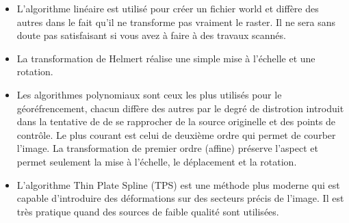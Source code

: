 \begin{itemize}[label=--]
\item L'algorithme linéaire est utilisé pour créer un fichier world et diffère des autres dans le fait qu'il ne transforme pas vraiment le raster. Il ne sera sans doute pas satisfaisant si vous avez à faire à des travaux scannés.
\item La transformation de Helmert réalise une simple mise à l'échelle et une rotation.
\item Les algorithmes polynomiaux sont ceux les plus utilisés pour le géoréfrencement, chacun diffère des autres par le degré de distrotion introduit dans la tentative de de se rapprocher de la source originelle et des points de contrôle. Le plus courant est celui de deuxième ordre qui permet de courber l'image. La transformation de premier ordre (affine) préserve l'aspect et permet seulement la mise à l'échelle, le déplacement et la rotation.
\item L'algorithme Thin Plate Spline (TPS) est une méthode plus moderne qui est capable d'introduire des déformations sur des secteurs précis de l'image. Il est très pratique quand des sources de faible qualité sont utilisées.
\end{itemize}

\label{georeferencer_running}

